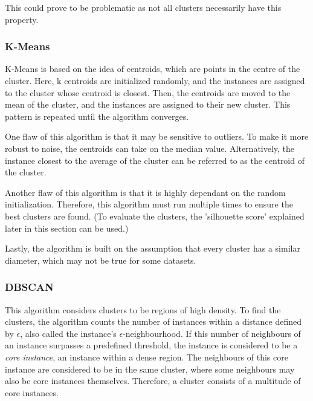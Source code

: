 This could prove to be problematic as not all clusters necessarily have this property.

\subsubsection{K-Means }

K-Means\citep{lloydLeastSquaresQuantization1982} is based on the idea of centroids, which are points in the centre of the cluster. Here, k centroids are initialized randomly, and the instances are assigned to the cluster whose centroid is closest. Then, the centroids are moved to the mean of the cluster, and the instances are assigned to their new cluster. This pattern is repeated until the algorithm converges.

One flaw of this algorithm is that it may be sensitive to outliers. To make it more robust to noise, the centroids can take on the median value. Alternatively, the instance closest to the average of the cluster can be referred to as the centroid of the cluster.

Another flaw of this algorithm is that it is highly dependant on the random initialization. Therefore, this algorithm must run multiple times to ensure the best clusters are found. (To evaluate the clusters, the 'silhouette score' explained later in this section can be used.)

Lastly, the algorithm is built on the assumption that every cluster has a similar diameter, which may not be true for some datasets.

\subsubsection{DBSCAN}

This algorithm considers clusters to be regions of high density. To find the clusters, the algorithm counts the number of instances within a distance defined by $\epsilon$, also called the instance's $\epsilon$-neighbourhood. If this number of neighbours of an instance surpasses a predefined threshold, the instance is considered to be a \textit{core instance}, an instance within a dense region. The neighbours of this core instance are considered to be in the same cluster, where some neighbours may also be core instances themselves. Therefore, a cluster consists of a multitude of core instances.
